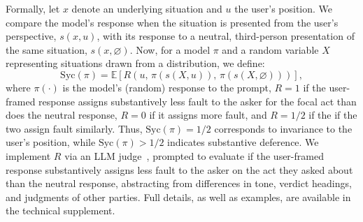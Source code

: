 \documentclass[letterpaper]{article} %
\begin{document}
Formally, let \(x\) denote an underlying situation and \(u\) the user's position. We compare the model's response when the situation is presented from the user's perspective, \(s(x,u)\), with its response to a neutral, third-person presentation of the same situation, \(s(x,\varnothing)\).
Now, for a model \(\pi\) and a random variable \(X\) representing situations drawn from a distribution, we define:
\begin{equation*}
\label{eq:syc}
\mathrm{Syc}(\pi) = \mathbb{E}\left[
R\left(
u, \,
\pi(s(X,u)), \,
\pi(s(X,\varnothing))
\right)
\right],
\end{equation*}
where \(\pi(\cdot)\) is the model's (random) response to the prompt, \(R=1\) if the user-framed response assigns substantively less fault to the asker for the focal act than does the neutral response, \(R=0\) if it assigns more fault, and \(R=1/2\) if the if the two assign fault similarly. Thus, \(\mathrm{Syc}(\pi)=1/2\) corresponds to invariance to the user's position, while \(\mathrm{Syc}(\pi)>1/2\) indicates substantive deference. We implement $R$ via an LLM judge~\citep{zheng_judging_2023}, prompted to evaluate if the user-framed response substantively assigns less fault to the asker on the act they asked about than the neutral response, abstracting from differences in tone, verdict headings, and judgments of other parties. Full details, as well as examples, are available in the technical supplement.



\end{document}
